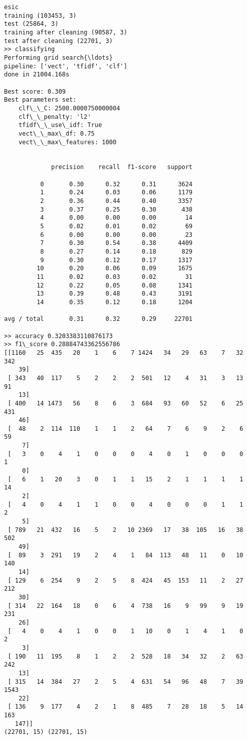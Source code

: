 \documentclass[11pt]{article}
\begin{document}
    \begin{Verbatim}[commandchars=\\\{\}]
esic
training (103453, 3)
test (25864, 3)
training after cleaning (90587, 3)
test after cleaning (22701, 3)
>> classifying
Performing grid search{\ldots}
pipeline: ['vect', 'tfidf', 'clf']
done in 21004.168s

Best score: 0.309
Best parameters set:
	clf\_\_C: 2500.0000750000004
	clf\_\_penalty: 'l2'
	tfidf\_\_use\_idf: True
	vect\_\_max\_df: 0.75
	vect\_\_max\_features: 1000


             precision    recall  f1-score   support

          0       0.30      0.32      0.31      3624
          1       0.24      0.03      0.06      1179
          2       0.36      0.44      0.40      3357
          3       0.37      0.25      0.30       438
          4       0.00      0.00      0.00        14
          5       0.02      0.01      0.02        69
          6       0.00      0.00      0.00        23
          7       0.30      0.54      0.38      4409
          8       0.27      0.14      0.18       829
          9       0.30      0.12      0.17      1317
         10       0.20      0.06      0.09      1675
         11       0.02      0.03      0.02        31
         12       0.22      0.05      0.08      1341
         13       0.39      0.48      0.43      3191
         14       0.35      0.12      0.18      1204

avg / total       0.31      0.32      0.29     22701

>> accuracy 0.3203383110876173
>> f1\_score 0.28884743362556786
[[1160   25  435   20    1    6    7 1424   34   29   63    7   32  342
    39]
 [ 343   40  117    5    2    2    2  501   12    4   31    3   13   91
    13]
 [ 400   14 1473   56    8    6    3  684   93   60   52    6   25  431
    46]
 [  48    2  114  110    1    1    2   64    7    6    9    2    6   59
     7]
 [   3    0    4    1    0    0    0    4    0    1    0    0    0    1
     0]
 [   6    1   20    3    0    1    1   15    2    1    1    1    1   14
     2]
 [   4    0    4    1    1    0    0    4    0    0    0    1    1    2
     5]
 [ 789   21  432   16    5    2   10 2369   17   38  105   16   38  502
    49]
 [  89    3  291   19    2    4    1   84  113   48   11    0   10  140
    14]
 [ 129    6  254    9    2    5    8  424   45  153   11    2   27  212
    30]
 [ 314   22  164   18    0    6    4  738   16    9   99    9   19  231
    26]
 [   4    0    4    1    0    0    1   10    0    1    4    1    0    2
     3]
 [ 190   11  195    8    1    2    2  528   18   34   32    2   63  242
    13]
 [ 315   14  384   27    2    5    4  631   54   96   48    7   39 1543
    22]
 [ 136    9  177    4    2    1    8  485    7   28   18    5   14  163
   147]]
(22701, 15) (22701, 15)

    \end{Verbatim}
\end{document}
